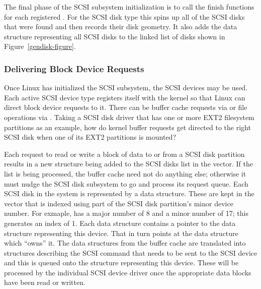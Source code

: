 The final phase of the SCSI subsystem initialization is to call the finish functions for each registered
.
For the SCSI disk type this spins up all of the SCSI disks that were found and then records their disk geometry.
It also adds the  data structure representing all SCSI disks to the linked list of disks shown 
in Figure~\ref{gendisk-figure}.

\subsubsection{Delivering Block Device Requests}
Once Linux has initialized the SCSI subsystem, the SCSI devices may be used.
Each active SCSI device type registers itself with the kernel so that Linux can direct block
device requests to it.
There can be buffer cache requests via  or file operations
via .
Taking a SCSI disk driver that has one or more EXT2 filesystem partitions as an example, how do kernel
buffer requests get directed to the right SCSI disk when one of its EXT2 partitions is mounted?

Each request to read or write a block of data to or from a SCSI disk partition results in a new
 structure being added to the SCSI disks  list in the 
 vector.
If the  list is being processed, the buffer cache need not do anything else; otherwise
it must nudge the SCSI disk subsystem to go and process its request queue.
Each SCSI disk in the system is represented by a  data structure.
These are kept in the  vector that is indexed using
part of the SCSI disk partition's minor device number.
For exmaple,  has a major number of 8 and a minor number of 17; this generates an index of 1.
Each  data structure contains a pointer to the  data structure representing
this device.
That in turn points at the  data structure which ``owns'' it.
The  data structures from the buffer cache are translated into  structures describing
the SCSI command that needs to be sent to the SCSI device and this is queued onto the  
structure representing this device.
These will be processed by the individual SCSI device driver once the appropriate data blocks have been
read or written.

